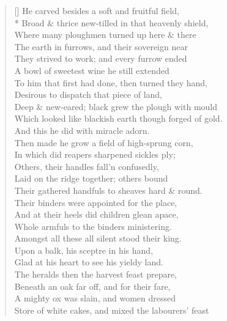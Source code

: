 \documentclass[MAIN]{subfiles}
\begin{document}
\settowidth{\versewidth}{Which looked like blackish earth though forged of gold.}
\begin{verse}[\versewidth]
He carved besides a soft and fruitful field,\\*
Broad \& thrice new-tilled in that heavenly shield,\\
Where many ploughmen turned up here \& there\\
The earth in furrows, and their sovereign near\\
They strived to work; and every furrow ended\\
A bowl of sweetest wine he still extended\\
To him that first had done, then turned they hand,\\
Desirous to dispatch that piece of land,\\
Deep \& new-eared; black grew the plough with mould\\
Which looked like blackish earth though forged of gold.\\
And this he did with miracle adorn.\\
Then made he grow a field of high-sprung corn,\\
In which did reapers sharpened sickles ply;\\
Others, their handles fall'n confusedly,\\
Laid on the ridge together; others bound\\
Their gathered handfuls to sheaves hard \& round.\\
Their binders were appointed for the place,\\
And at their heels did children glean apace,\\
Whole armfuls to the binders ministering.\\
Amongst all these all silent stood their king.\\
Upon a balk, his sceptre in his hand,\\
Glad at his heart to see his yieldy land.\\
The heralds then the harvest feast prepare,\\
Beneath an oak far off, and for their fare,\\
A mighty ox was slain, and women dressed\\
Store of white cakes, and mixed the labourers' feast\\

\end{verse}
\end{document}
